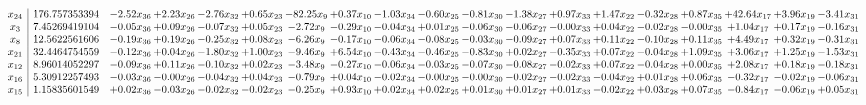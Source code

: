 \documentclass[9pt]{article}
\begin{document}
 \[\begin{array}{c| c c@{\hskip 2pt} c@{\hskip 2pt} c@{\hskip 2pt} c@{\hskip 2pt} c@{\hskip 2pt} c@{\hskip 2pt} c@{\hskip 2pt} c@{\hskip 2pt} c@{\hskip 2pt} c@{\hskip 2pt} c@{\hskip 2pt} c@{\hskip 2pt} c@{\hskip 2pt} c@{\hskip 2pt} c@{\hskip 2pt} c@{\hskip 2pt} c@{\hskip 2pt} }
 x_{24}   &  176.757353394 & -2.52 x_{36} & +  2.23 x_{26} & -2.76 x_{32} & +  0.65 x_{23} & -82.25 x_{9} & +  0.37 x_{10} & -1.03 x_{34} & -0.60 x_{25} & -0.81 x_{30} & -1.38 x_{27} & +  0.97 x_{33} & +  1.47 x_{22} & -0.32 x_{28} & +  0.87 x_{35} & + 42.64 x_{17} & +  3.96 x_{19} & -3.41 x_{31}\\
 x_{3}   &  7.45269419104 & -0.05 x_{36} & +  0.09 x_{26} & -0.07 x_{32} & +  0.05 x_{23} & -2.72 x_{9} & -0.29 x_{10} & -0.04 x_{34} & +  0.01 x_{25} & -0.06 x_{30} & -0.06 x_{27} & -0.00 x_{33} & +  0.04 x_{22} & -0.02 x_{28} & -0.00 x_{35} & +  1.04 x_{17} & +  0.17 x_{19} & -0.16 x_{31}\\
 x_{8}   &  12.5622561606 & -0.19 x_{36} & +  0.19 x_{26} & -0.25 x_{32} & +  0.08 x_{23} & -6.26 x_{9} & -0.17 x_{10} & -0.06 x_{34} & -0.08 x_{25} & -0.03 x_{30} & -0.09 x_{27} & +  0.07 x_{33} & +  0.11 x_{22} & -0.10 x_{28} & +  0.11 x_{35} & +  4.49 x_{17} & +  0.32 x_{19} & -0.31 x_{31}\\
 x_{21}   &  32.4464754559 & -0.12 x_{36} & +  0.04 x_{26} & -1.80 x_{32} & +  1.00 x_{23} & -9.46 x_{9} & +  6.54 x_{10} & -0.43 x_{34} & -0.46 x_{25} & -0.83 x_{30} & +  0.02 x_{27} & -0.35 x_{33} & +  0.07 x_{22} & -0.04 x_{28} & +  1.09 x_{35} & +  3.06 x_{17} & +  1.25 x_{19} & -1.53 x_{31}\\
 x_{12}   &  8.96014052297 & -0.09 x_{36} & +  0.11 x_{26} & -0.10 x_{32} & +  0.02 x_{23} & -3.48 x_{9} & -0.27 x_{10} & -0.06 x_{34} & -0.03 x_{25} & -0.07 x_{30} & -0.08 x_{27} & -0.02 x_{33} & +  0.07 x_{22} & -0.04 x_{28} & +  0.00 x_{35} & +  2.08 x_{17} & +  0.18 x_{19} & -0.18 x_{31}\\
 x_{16}   &  5.30912257493 & -0.03 x_{36} & -0.00 x_{26} & -0.04 x_{32} & +  0.04 x_{23} & -0.79 x_{9} & +  0.04 x_{10} & -0.02 x_{34} & -0.00 x_{25} & -0.00 x_{30} & -0.02 x_{27} & -0.02 x_{33} & -0.04 x_{22} & +  0.01 x_{28} & +  0.06 x_{35} & -0.32 x_{17} & -0.02 x_{19} & -0.06 x_{31}\\
 x_{15}   &  1.15835601549 & +  0.02 x_{36} & -0.03 x_{26} & -0.02 x_{32} & -0.02 x_{23} & -0.25 x_{9} & +  0.93 x_{10} & +  0.02 x_{34} & +  0.02 x_{25} & +  0.01 x_{30} & +  0.01 x_{27} & +  0.01 x_{33} & -0.02 x_{22} & +  0.03 x_{28} & +  0.07 x_{35} & -0.84 x_{17} & -0.06 x_{19} & +  0.05 x_{31}\\

\end{array}\]
\end{document}
